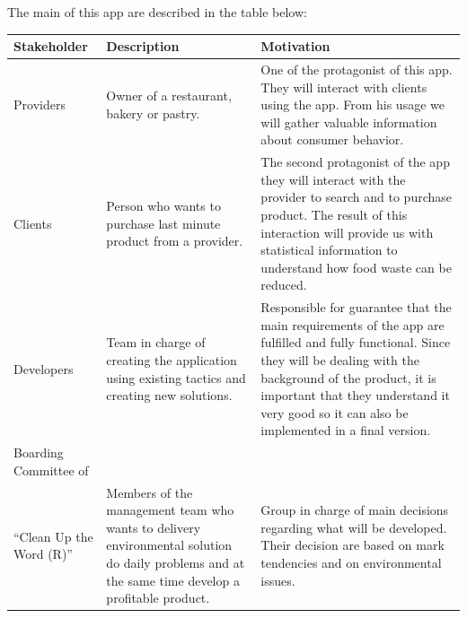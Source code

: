 The main  of this app are described in the table below:

\begin{table}[H]
    \begin{tabularx}{\textwidth}{lXX}
    \toprule
    Stakeholder & Description & Motivation  \\
    \midrule
    Providers & Owner of a restaurant, bakery or pastry. & One of the protagonist of this app. They will interact
    with clients using the app. From his usage we will gather valuable information about consumer behavior. \\
    Clients & Person who wants to purchase last minute product from a provider. & The second protagonist of the app
    they will interact with the provider to search and to purchase product. The result of this interaction will
    provide us with statistical information to understand how food waste can be reduced.  \\
    Developers & Team in charge of creating the application using existing tactics and creating new solutions.
    & Responsible for guarantee that the main requirements of the app are fulfilled and fully functional. 
    Since they will be dealing with the background of the product, it is important that they understand it very
    good so it can also be implemented in a final version.\\
    Boarding Committee of \\ ``Clean Up the Word (R)'' & Members of the management team who wants to delivery 
    environmental solution do daily problems and at the same time develop a profitable product.
    & Group in charge of main decisions regarding what will be developed. Their decision are based on mark tendencies
    and on environmental issues.  \\
    \bottomrule
    \end{tabularx}
\end{table}
